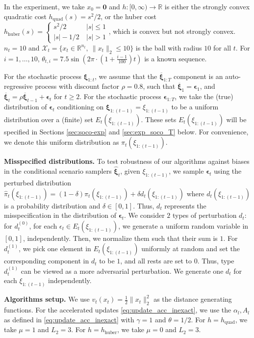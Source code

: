 \documentclass[11pt,fullpage,letterpaper]{article}
\newcommand{\mc}{\mathcal}
\newcommand{\mb}{\mathbf}
\newcommand{\R}{\mathbb{R}}
\newcommand{\bx}{\boldsymbol{\xi}}
\begin{document}
In the experiment, we take $x_0 = \mb 0$  and $h:[0,\infty)\to \R$ is either the strongly convex quadratic cost $h_{\text{quad}}(s) = s^2/2$, or the huber cost $h_{\text{huber}}(s) = \begin{cases}
    s^2/2~ &|s|\leq 1\\
    |s| - 1/2~ &|s|>1 
\end{cases}$, which is convex but not strongly convex. $n_t=10$ and $\mc X_t = \{x_t\in \R^{n_t}, ~\|x_t\|_2\leq 10\}$ is the ball with radius $10$ for all $t$. For $i=1,\ldots,10$, $\theta_{t,i} = 7.5\sin(2\pi \cdot (1+\frac{i-1}{100})t)$ is a known sequence. 

For the stochastic process $\bx_{1:t}$, we assume that the $\overline{\bx}_{1:T}$ component is an auto-regressive process with discount factor $\rho = 0.8$, such that $\overline{\bx}_1 = \boldsymbol{\epsilon}_1$, and $\overline{\bx}_{t} = \rho \overline{\bx}_{t-1} + \boldsymbol{\epsilon}_t$ for $t\geq 2$. For the stochastic process $\boldsymbol{\epsilon}_{1:T}$, we take the (true) distribution of  $\boldsymbol{\epsilon}_t$ conditioning on $\bx_{1:(t-1)}=\xi_{1:(t-1)}$ to be a uniform distribution over a (finite) set $E_t(\xi_{1:(t-1)})$. These sets $E_t(\xi_{1:(t-1)})$ will be specified in Sections \ref{sec:soco-exp} and \ref{sec:exp_soco_T} below. For convenience, we denote this uniform distribution as $\pi_t(\xi_{1:(t-1)})$. 




\textbf{Misspecified distributions.} To test robustness of our algorithms against biases in the conditional scenario samplers $\widehat{\bx}_t$, given $\xi_{1:(t-1)}$, we sample $\boldsymbol{\epsilon}_t$ using the perturbed distribution $\hat{\pi}_t(\xi_{1:(t-1)}) = (1-\delta)\pi_t(\xi_{1:(t-1)}) + \delta d_t(\xi_{1:(t-1)})$ where $d_t(\xi_{1:(t-1)})$ is a probability distribution and $\delta\in [0,1]$. Thus, $d_t$ represents the misspecification in the distribution of $\boldsymbol{\epsilon}_t$. We consider $2$ types of perturbation $d_t$: for $d^{(0)}_t$, for each $\epsilon_t\in E_{t}(\xi_{1:(t-1)})$, we generate a uniform random variable in $[0,1]$, independently. Then, we normalize them such that their sum is $1$. For $d^{(1)}_t$, we pick one element in $E_{t}(\xi_{1:(t-1)})$ uniformly at random and set the corresponding component in $d_t$ to be $1$, and all rests are set to $0$. Thus, type $d^{(1)}_t$ can be viewed as a more adversarial perturbation. We generate one $d_t$ for each $\xi_{1:(t-1)}$ independently.


\textbf{Algorithms setup.} We use $v_t(x_t) = \frac{1}{2}\|x_t\|_2^2$ as the distance generating functions. For the accelerated updates \eqref{eq:update_acc_inexact}, we use the $\alpha_l,A_l$ as defined in \eqref{eq:update_acc_inexact} with $\gamma = 1$ and $\theta = 1/2$. For $h= h_{\text{quad}}$, we take $\mu = 1$ and $L_2 = 3$. For $h=h_{\text{huber}}$, we take $\mu = 0$ and $L_2 = 3$. 
\end{document}
